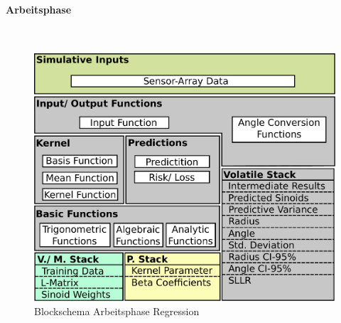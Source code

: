 \clearpage


\paragraph{Arbeitsphase}\label{par:gpr-work-pro}$~$\\


\begin{figure}[tbph]
	\centering
	\includegraphics[width=0.7\linewidth]{chapters/images/3-SW-E-OExp/Blockschema_Workphase}
	\caption[Blockschema Arbeitsphase Regression]{Blockschema Arbeitsphase Regression}
	\label{fig:blockschemaworkphase}
\end{figure}

